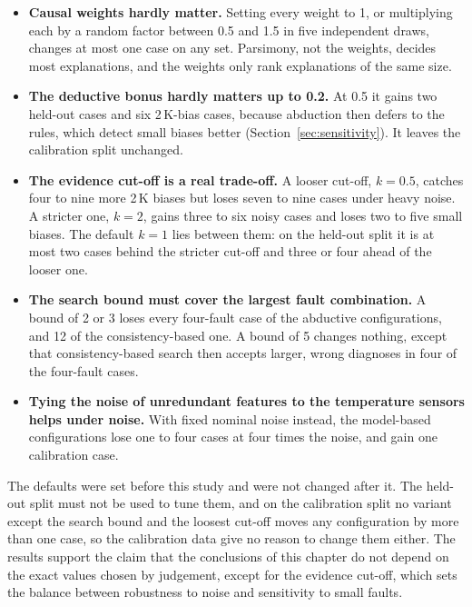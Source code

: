 

\begin{itemize}
  \item \textbf{Causal weights hardly matter.} Setting every weight to 1, or multiplying each by a random factor between 0.5 and 1.5 in five independent draws, changes at most one case on any set. Parsimony, not the weights, decides most explanations, and the weights only rank explanations of the same size.
  \item \textbf{The deductive bonus hardly matters up to 0.2.} At 0.5 it gains two held-out cases and six 2\,K-bias cases, because abduction then defers to the rules, which detect small biases better (Section~\ref{sec:sensitivity}). It leaves the calibration split unchanged.
  \item \textbf{The evidence cut-off is a real trade-off.} A looser cut-off, $k = 0.5$, catches four to nine more 2\,K biases but loses seven to nine cases under heavy noise. A stricter one, $k = 2$, gains three to six noisy cases and loses two to five small biases. The default $k = 1$ lies between them: on the held-out split it is at most two cases behind the stricter cut-off and three or four ahead of the looser one.
  \item \textbf{The search bound must cover the largest fault combination.} A bound of 2 or 3 loses every four-fault case of the abductive configurations, and 12 of the consistency-based one. A bound of 5 changes nothing, except that consistency-based search then accepts larger, wrong diagnoses in four of the four-fault cases.
  \item \textbf{Tying the noise of unredundant features to the temperature sensors helps under noise.} With fixed nominal noise instead, the model-based configurations lose one to four cases at four times the noise, and gain one calibration case.
\end{itemize}

The defaults were set before this study and were not changed after it. The held-out split must not be used to tune them, and on the calibration split no variant except the search bound and the loosest cut-off moves any configuration by more than one case, so the calibration data give no reason to change them either. The results support the claim that the conclusions of this chapter do not depend on the exact values chosen by judgement, except for the evidence cut-off, which sets the balance between robustness to noise and sensitivity to small faults.

